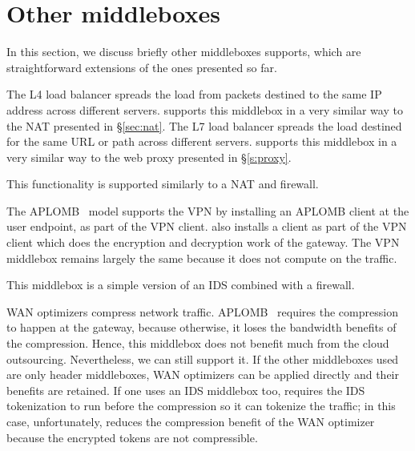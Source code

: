 
\section{Other middleboxes}\label{sec:vpn} \label{sec:other_apps} \label{sec:not_supp}\label{sec:loadb}

In this section, we discuss briefly other middleboxes \sys supports, which are straightforward extensions of the ones presented so far. 

The L4 load balancer spreads the load from packets destined to the same IP address across different servers. \sys supports this middlebox in a 
very similar way to the NAT presented in \S\ref{sec:nat}. The L7 load balancer spreads the load destined for the same URL or path across 
different servers. \sys supports this middlebox in a very similar way to the web proxy presented in \S\ref{s:proxy}. 


 This functionality is supported similarly to a NAT and firewall. 


 The APLOMB~\cite{aplomb} model supports the VPN by installing an APLOMB client at the user endpoint, as part of the VPN client.
\sys also installs a \sys client as part of the VPN client which does the encryption and decryption work of the gateway. The VPN middlebox remains
largely the same because it does not compute on the traffic. 


 This middlebox is a simple version of an IDS combined with a firewall. 


 WAN optimizers compress network traffic. APLOMB~\cite{aplomb} requires the compression to happen
at the gateway, because otherwise, it loses the bandwidth benefits of the compression. Hence, this middlebox does not benefit much 
 from the cloud outsourcing. 
Nevertheless, we can still support it. 
If the other middleboxes used are only header middleboxes, WAN optimizers can be applied directly and their benefits are retained.
If one uses an IDS middlebox too, \sys  requires  the IDS tokenization  to run before the compression so it can tokenize
the traffic; in this case, unfortunately, \sys  reduces the compression benefit of the WAN optimizer because the encrypted tokens 
are not compressible. 




%
%
%
%
%
%
%
%


